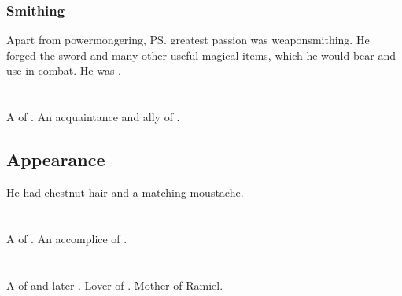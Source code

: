 \subsubsection{Smithing}
Apart from powermongering, \ps{\Dasteron} greatest passion was weaponsmithing. 
He forged the sword  and many other useful magical items, which he would bear and use in combat. 
He was . 















\section{\Dezruth}
\index{\Dezruth}
A \thelyad{} \resphan{} of \Mystraacht. 
An acquaintance and ally of . 









\subsection{Appearance}
He had chestnut hair and a matching moustache. 















\section{\Gilchad}
\index{\Gilchad}
A \thelyad{} \resphan{} of \Mystraacht. 
An accomplice of \Cishiel. 

















\section{\Lyorith}
\index{\Lyorith}
A \resvil{} of \Merkyrah{} and later \Mystraacht. 
Lover of \Nathrach. 
Mother of Ramiel. 










